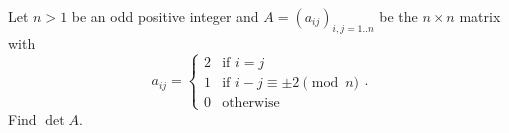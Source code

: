 Let $ n > 1$ be an odd positive integer and $ A = (a_{ij})_{i, j = 1..n}$ be the $ n \times n$ matrix with
\[ a_{ij}= \begin{cases}2 & \text{if }i = j \\ 1 & \text{if }i-j \equiv \pm 2 \pmod n \\ 0 & \text{otherwise}\end{cases}.\]
Find $ \det A$.